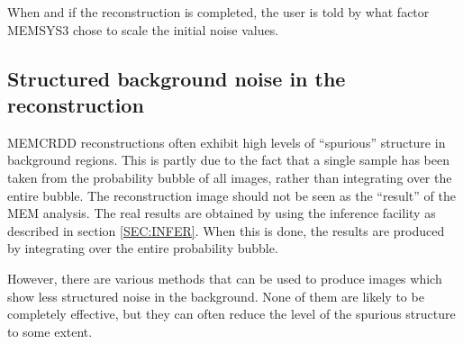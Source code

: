 When and if the reconstruction is completed, the user is told by what factor
MEMSYS3 chose to scale the initial noise values.

\subsection {Structured background noise in the reconstruction}
\label {SEC:ICFB}

MEMCRDD reconstructions often exhibit high levels of ``spurious'' structure in
background regions. This is partly due to the fact that a single sample has
been taken from the probability bubble of all images, rather than integrating
over the entire bubble. The reconstruction image should not be seen as the
``result'' of the MEM analysis. The real results are obtained by using the
inference facility as described in section \ref {SEC:INFER}. When this is done,
the results are produced by integrating over the entire probability bubble.

However, there are various methods that can be used to produce images which
show  less structured noise in the background. None of them are likely to be
completely effective, but they can often reduce the level of the spurious
structure to some extent.

